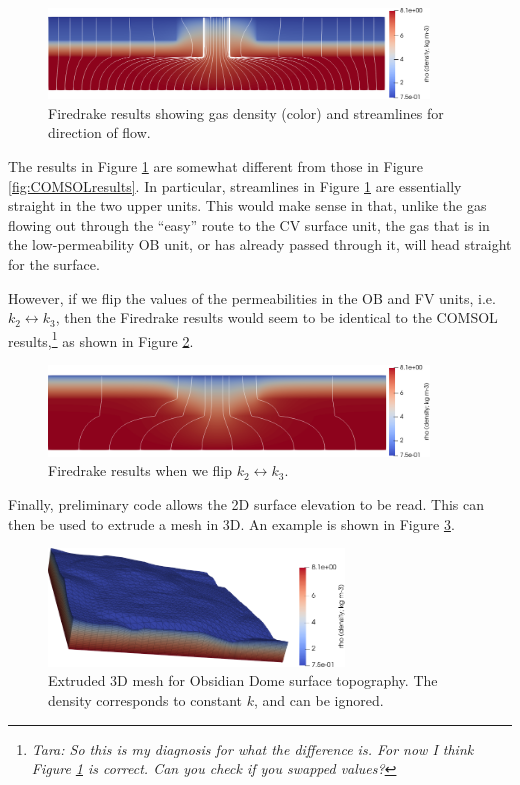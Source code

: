 \documentclass[11pt]{amsart}
\begin{document}
\begin{figure}
   \centering
\includegraphics[width=0.9\textwidth]{figs/results2d.png}
\caption{Firedrake results showing gas density (color) and streamlines for direction of flow.}
\label{fig:results2d}
\end{figure}

The results in Figure \ref{fig:results2d} are somewhat different from those in Figure \ref{fig:COMSOLresults}.  In particular, streamlines in Figure \ref{fig:results2d} are essentially straight in the two upper units.  This would make sense in that, unlike the gas flowing out through the ``easy'' route to the CV surface unit, the gas that is in the low-permeability OB unit, or has already passed through it, will head straight for the surface.

However, if we flip the values of the permeabilities in the OB and FV units, i.e.~$k_2 \leftrightarrow k_3$, then the Firedrake results would seem to be identical to the COMSOL results,\footnote{\emph{Tara:  So this is my diagnosis for what the difference is.  For now I think Figure \ref{fig:results2d} is correct.  Can you check if you swapped values?}} as shown in Figure \ref{fig:results2dflip}.

\begin{figure}
   \centering
\includegraphics[width=0.9\textwidth]{figs/results2d-flipOBFV.png}
\caption{Firedrake results when we flip $k_2\leftrightarrow k_3$.}
\label{fig:results2dflip}
\end{figure}

Finally, preliminary code allows the 2D surface elevation to be read.  This can then be used to extrude a mesh in 3D.  An example is shown in Figure \ref{fig:mesh3d}.

\begin{figure}
   \centering
\includegraphics[width=0.7\textwidth]{figs/mesh3d.png}
\caption{Extruded 3D mesh for Obsidian Dome surface topography.  The density corresponds to constant $k$, and can be ignored.}
\label{fig:mesh3d}
\end{figure}

\printbibliography
\end{document}

